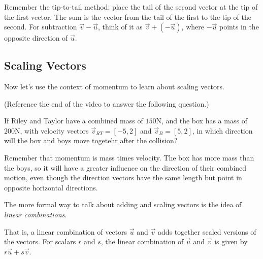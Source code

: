 \documentclass{ximera}
\begin{document}
\begin{problem}
    \begin{feedback}
        Remember the tip-to-tail method: place the tail of the second vector at the tip of the first vector. The sum is the vector from the tail of the first to the tip of the second. For subtraction $\vec{v}-\vec{u}$, think of it as $\vec{v}+(-\vec{u})$, where $-\vec{u}$ points in the opposite direction of $\vec{u}$.
    \end{feedback}
\end{problem}

\subsection*{Scaling Vectors}

Now let's use the context of momentum to learn about scaling vectors.


\begin{problem}
    (Reference the end of the video to answer the following question.)
    
    If Riley and Taylor have a combined mass of $150$N, and the box has a mass of $200$N, with velocity vectors $\vec{v}_{RT}=[-5,2]$ and $\vec{v}_B=[5,2]$, in which direction will the box and boys move togetehr after the collision?
    \begin{multipleChoice}
    \end{multipleChoice}
    \begin{feedback}
        Remember that momentum is mass times velocity. The box has more mass than the boys, so it will have a greater influence on the direction of their combined motion, even though the direction vectors have the same length but point in opposite horizontal directions.
    \end{feedback}
\end{problem}

\begin{definition}
The more formal way to talk about adding and scaling vectors is the idea of \emph{linear combinations}. 

That is, a linear combination of vectors $\vec{u}$ and $\vec{v}$ adds together scaled versions of the vectors. For scalars $r$ and $s$, the linear combination of $\vec{u}$ and $\vec{v}$ is given by $r\vec{u}+s\vec{v}$.
\end{definition}
\end{document}
